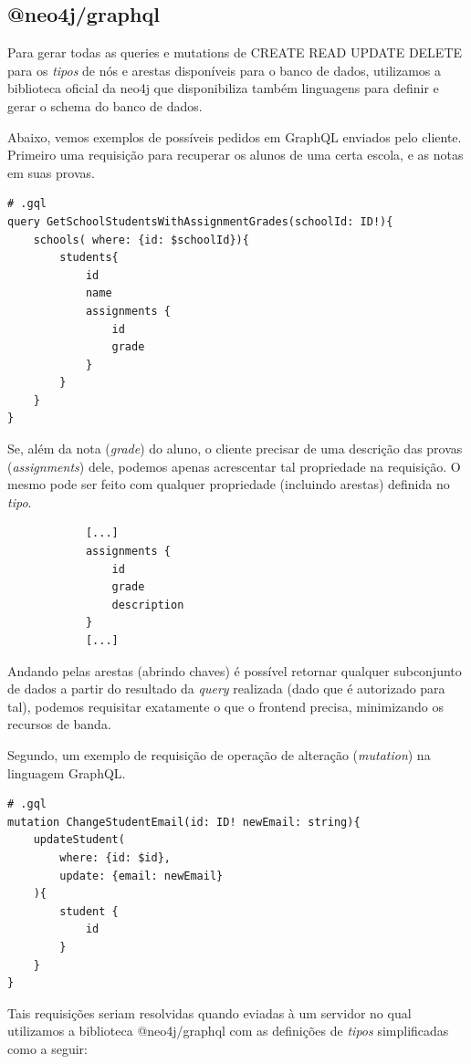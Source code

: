 \subsection{@neo4j/graphql}
Para gerar todas as queries e mutations de CREATE READ UPDATE DELETE para os \textit{tipos} de nós e arestas disponíveis para o banco de dados, utilizamos 
a biblioteca oficial da neo4j que disponibiliza também linguagens para definir e gerar o schema do banco de dados.

Abaixo, vemos exemplos de possíveis pedidos em GraphQL enviados pelo cliente. Primeiro uma requisição para recuperar os alunos de uma certa escola, e as notas em suas provas.

\begin{lstlisting}
# .gql
query GetSchoolStudentsWithAssignmentGrades(schoolId: ID!){
    schools( where: {id: $schoolId}){
        students{
            id
            name
            assignments {
                id
                grade
            }
        }
    }
}
\end{lstlisting}

Se, além da nota (\textit{grade}) do aluno, o cliente precisar de uma descrição das provas (\textit{assignments}) dele, podemos apenas acrescentar tal propriedade na requisição. O mesmo pode ser feito com qualquer propriedade (incluindo arestas) definida no \textit{tipo}.

\begin{lstlisting}
            [...]
            assignments {
                id
                grade
                description
            }
            [...]
\end{lstlisting}
Andando pelas arestas (abrindo chaves) é possível retornar qualquer subconjunto de dados a partir do resultado da \textit{query} realizada (dado que é autorizado para tal), podemos requisitar exatamente o que o frontend precisa, minimizando os recursos de banda.

Segundo, um exemplo de requisição de operação de alteração (\textit{mutation}) na linguagem GraphQL.

\begin{lstlisting}
# .gql
mutation ChangeStudentEmail(id: ID! newEmail: string){
    updateStudent(
        where: {id: $id}, 
        update: {email: newEmail}
    ){
        student {
            id
        }
    }
}
\end{lstlisting}

Tais requisições seriam resolvidas quando eviadas à um servidor no qual utilizamos a biblioteca @neo4j/graphql com as definições de \textit{tipos} simplificadas como a seguir:

